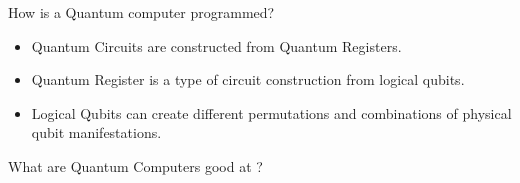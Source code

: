 \begin{frame}{How is a Quantum computer programmed?}
    \begin{itemize}
        \item \alert{Quantum Circuits} are constructed from Quantum Registers.
        \item \alert{Quantum Register} is a type of circuit construction from logical qubits. 
        \item \alert{Logical Qubits} can create different permutations and combinations of physical qubit manifestations.
    \end{itemize}
\end{frame}

\begin{frame}[fragile]{What are Quantum Computers good at ?}
    \begin{figure}[h!]
         \captionsetup[subfloat]{labelformat=empty}
          \quad
		  \quad
    \end{figure}
\end{frame}


